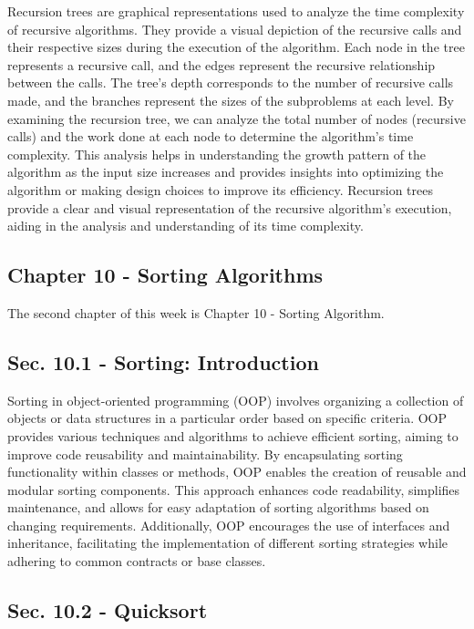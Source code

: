 Recursion trees are graphical representations used to analyze the time complexity of recursive algorithms. They provide a visual depiction of the recursive calls and their respective sizes during the execution of the algorithm. Each node in the tree represents a recursive call, and the edges represent the recursive relationship between the calls. The tree's depth corresponds to the number of recursive calls made, and the branches represent the sizes of the subproblems at 
each level. By examining the recursion tree, we can analyze the total number of nodes (recursive calls) and the work done at each node to determine the algorithm's time complexity. This analysis helps in understanding the growth pattern of the algorithm as the input size increases and provides insights into optimizing the algorithm or making design choices to improve its efficiency. Recursion trees provide a clear and visual representation of the recursive algorithm's 
execution, aiding in the analysis and understanding of its time complexity.

\subsection{Chapter 10 - Sorting Algorithms}

The second chapter of this week is Chapter 10 - Sorting Algorithm.

\subsection*{Sec. 10.1 - Sorting: Introduction}

Sorting in object-oriented programming (OOP) involves organizing a collection of objects or data structures in a particular order based on specific criteria. OOP provides various techniques and algorithms to achieve efficient sorting, aiming to improve code reusability and maintainability. By encapsulating sorting functionality within classes or methods, OOP enables the creation of reusable and modular sorting components. This approach enhances code readability, simplifies 
maintenance, and allows for easy adaptation of sorting algorithms based on changing requirements. Additionally, OOP encourages the use of interfaces and inheritance, facilitating the implementation of different sorting strategies while adhering to common contracts or base classes.

\subsection*{Sec. 10.2 - Quicksort}

